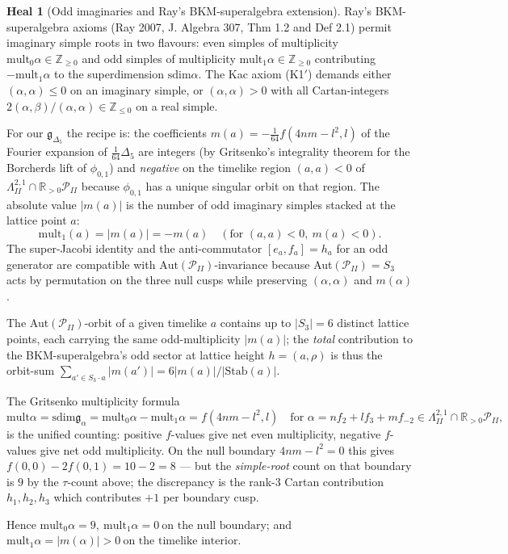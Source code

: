\documentclass[11pt]{article}
\theoremstyle{definition}
\newtheorem{heal}[theorem]{Heal}
\providecommand{\Z}{\mathbb{Z}}
\providecommand{\R}{\mathbb{R}}
\providecommand{\g}{\mathfrak{g}}
\providecommand{\Aut}{\mathrm{Aut}}
\providecommand{\mult}{\mathrm{mult}}
\providecommand{\sdim}{\mathrm{sdim}}
\providecommand{\LII}{\Lambda^{2,1}_{I\!I}}
\providecommand{\PII}{\mathcal{P}_{I\!I}}
\providecommand{\Deltafive}{\Delta_5}
\providecommand{\phionezero}{\phi_{0,1}}
\begin{document}
\begin{heal}[Odd imaginaries and Ray's BKM-superalgebra extension]
\label{heal:odd-imag-count}
Ray's BKM-superalgebra axioms (Ray 2007, J. Algebra 307, Thm 1.2 and
Def 2.1) permit imaginary simple roots in two flavours: even simples of
multiplicity $\mult_0\alpha\in\Z_{\ge 0}$ and odd simples of
multiplicity $\mult_1\alpha\in\Z_{\ge 0}$ contributing
$-\mult_1\alpha$ to the superdimension $\sdim\alpha$. The Kac axiom
(K1$'$) demands either $(\alpha,\alpha)\le 0$ on an imaginary simple,
or $(\alpha,\alpha)>0$ with all Cartan-integers
$2(\alpha,\beta)/(\alpha,\alpha)\in\Z_{\le 0}$ on a real simple.

For our $\g_{\Deltafive}$ the recipe is: the coefficients
$m(a)=-\tfrac{1}{64}f(4nm-l^2,l)$ of the Fourier expansion of
$\tfrac{1}{64}\Deltafive$ are integers (by Gritsenko's integrality
theorem for the Borcherds lift of $\phionezero$) and \emph{negative} on
the timelike region $(a,a)<0$ of
$\LII\cap\R_{>0}\PII$ because $\phionezero$ has a unique singular
orbit on that region. The absolute value $|m(a)|$ is the number of odd
imaginary simples stacked at the lattice point $a$:
\[
\mult_1(a)=|m(a)|=-m(a)\quad(\text{for }(a,a)<0,\ m(a)<0).
\]
The super-Jacobi identity and the anti-commutator $[e_a,f_a]=h_a$ for
an odd generator are compatible with $\Aut(\PII)$-invariance because
Aut$(\PII)=S_3$ acts by permutation on the three null cusps while
preserving $(\alpha,\alpha)$ and $m(\alpha)$.

The Aut$(\PII)$-orbit of a given timelike $a$ contains up to $|S_3|=6$
distinct lattice points, each carrying the same odd-multiplicity
$|m(a)|$; the \emph{total} contribution to the BKM-superalgebra's odd
sector at lattice height $h=(a,\rho)$ is thus the orbit-sum
$\sum_{a'\in S_3\cdot a}|m(a')|=6|m(a)|/|\mathrm{Stab}(a)|$.

The Gritsenko multiplicity formula
\[
\mult\alpha=\sdim\g_\alpha
=\mult_0\alpha-\mult_1\alpha
= f(4nm-l^2,l)
\quad\text{for }\alpha=n f_2+l f_3+m f_{-2}\in\LII\cap\R_{>0}\PII,
\]
is the unified counting: positive $f$-values give net even
multiplicity, negative $f$-values give net odd multiplicity. On the
null boundary $4nm-l^2=0$ this gives $f(0,0)-2f(0,1)=10-2=8$ --- but
the \emph{simple-root} count on that boundary is $9$ by the $\tau$-count
above; the discrepancy is the rank-$3$ Cartan contribution $h_1,h_2,h_3$
which contributes $+1$ per boundary cusp.

Hence $\boxed{\mult_0\alpha=9,\ \mult_1\alpha=0\ \text{on the null
boundary}}$; and $\boxed{\mult_1\alpha=|m(\alpha)|>0\ \text{on the
timelike interior}}$.
\end{heal}
\end{document}
